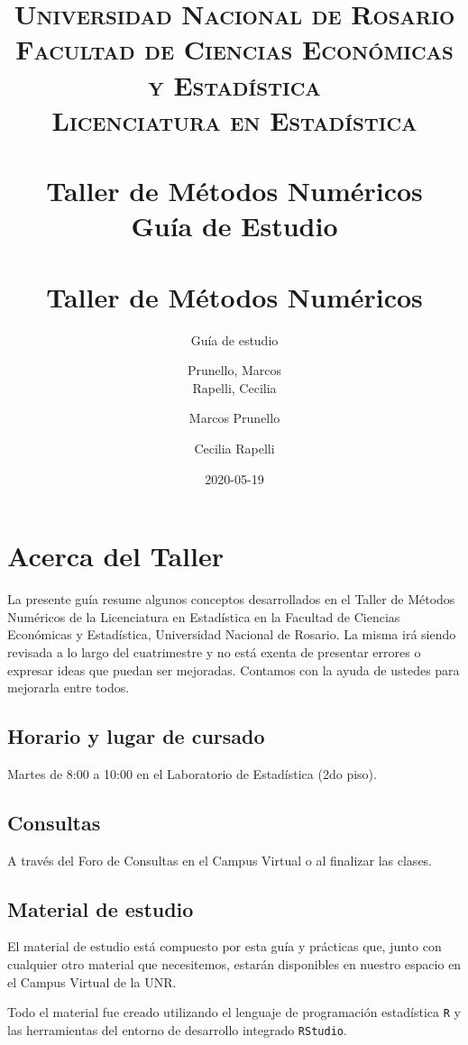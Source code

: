\documentclass[openany]{book}
\title{
	\usefont{OT1}{bch}{b}{n}
	\normalfont \normalsize
	\textsc{
		Universidad Nacional de Rosario \\
		Facultad de Ciencias Económicas y Estadística \\
		Licenciatura en Estadística
	} \\ [25pt]
	\horrule{2pt} \\[0.4cm]
	\huge \textbf{Taller de Métodos Numéricos} \\
	\bigbreak
	Guía de Estudio\\
	\horrule{2pt} \\[0.5cm]}
\author{
	\normalfont Prunello, Marcos \\
	\normalfont Rapelli, Cecilia
}
\title{Taller de Métodos Numéricos}
\subtitle{Guía de estudio}
\author{Marcos Prunello \and Cecilia Rapelli}
\date{2020-05-19}
\begin{document}
\maketitle

{
\setcounter{tocdepth}{1}
\tableofcontents
}
\hypertarget{acerca-del-taller}{%
\chapter*{Acerca del Taller}\label{acerca-del-taller}}

La presente guía resume algunos conceptos desarrollados en el Taller de Métodos Numéricos de la Licenciatura en Estadística en la Facultad de Ciencias Económicas y Estadística, Universidad Nacional de Rosario. La misma irá siendo revisada a lo largo del cuatrimestre y no está exenta de presentar errores o expresar ideas que puedan ser mejoradas. Contamos con la ayuda de ustedes para mejorarla entre todos.

\hypertarget{horario-y-lugar-de-cursado}{%
\section*{Horario y lugar de cursado}\label{horario-y-lugar-de-cursado}}

Martes de 8:00 a 10:00 en el Laboratorio de Estadística (2do piso).

\hypertarget{consultas}{%
\section*{Consultas}\label{consultas}}

A través del Foro de Consultas en el Campus Virtual o al finalizar las clases.

\hypertarget{material-de-estudio}{%
\section*{Material de estudio}\label{material-de-estudio}}

El material de estudio está compuesto por esta guía y prácticas que, junto con cualquier otro material que necesitemos, estarán disponibles en nuestro espacio en el Campus Virtual de la UNR.

Todo el material fue creado utilizando el lenguaje de programación estadística \texttt{R} y las herramientas del entorno de desarrollo integrado \texttt{RStudio}.
\end{document}
